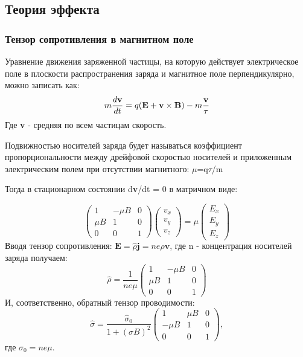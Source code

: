 \documentclass[a4paper, 12pt]{article}
\begin{document}
\subsection{Теория эффекта}
\subsubsection{Тензор сопротивления в магнитном поле}
Уравнение движения заряженной частицы, на которую действует электрическое поле в плоскости распространения заряда и магнитное поле перпендикулярно, можно записать как:
\begin{equation}
	m\frac{d\textbf{v}}{dt}=q(\textbf{E}+\textbf{v}\times\textbf{B})-m\frac{\textbf{v}}{\tau} \\
\end{equation}
Где \textbf{v} - средняя по всем частицам скорость. 

Подвижностью носителей заряда будет называться коэффициент пропорциональности между дрейфовой скоростью носителей и приложенным электрическим полем при отсутствии магнитного: $\mu$=q$\tau$/m

Тогда в стационарном состоянии d\textbf{v}/dt = 0 в матричном виде:

\begin{equation}
	\left(\begin{array}{ccc}
		1 & -\mu B & 0 \\
		\mu B & 1 & 0 \\
		0 & 0 & 1
	\end{array}\right)\left(\begin{array}{l}
		v_{x} \\
		v_{y} \\
		v_{z}
	\end{array}\right)=\mu\left(\begin{array}{l}
		E_{x} \\
		E_{y} \\
		E_{z}
	\end{array}\right)
\end{equation}
Вводя тензор сопротивления: $\textbf{E}=\hat{\rho} \textbf{j} = ne \hat{\rho}\textbf{v}$, где n - концентрация носителей заряда получаем:
\begin{equation}
	\hat{\rho}=\frac{1}{n e \mu}\left(\begin{array}{ccc}
		1 & -\mu B & 0 \\
		\mu B & 1 & 0 \\
		0 & 0 & 1
	\end{array}\right)
\end{equation}
И, соответственно, обратный тензор проводимости:
\begin{equation}
	\hat{\sigma}=\frac{\hat{\sigma}_{0}}{1+(\sigma B)^{2}}\left(\begin{array}{ccc}
		1 & \mu B & 0 \\
		-\mu B & 1 & 0 \\
		0 & 0 & 1
	\end{array}\right),
\end{equation}
где $\sigma_0=ne\mu$.
\end{document}
